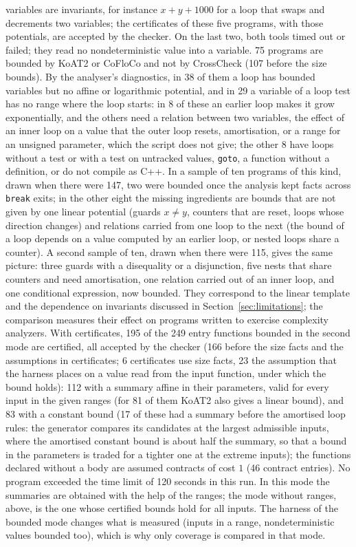 \documentclass[oneside,english]{amsart}
\numberwithin{equation}{section}
\numberwithin{figure}{section}
\theoremstyle{plain}
\theoremstyle{definition}
\theoremstyle{plain}
\theoremstyle{remark}
\theoremstyle{plain}
\theoremstyle{definition}
\theoremstyle{plain}
\theoremstyle{remark}
\begin{document}
variables are invariants, for instance $x + y + 1000$ for a loop that swaps and decrements two variables; the certificates of these five programs, with those potentials, are accepted by the checker. On the last two, both tools timed out or failed; they read no nondeterministic value into a variable. 75 programs are bounded by KoAT2 or CoFloCo and not by CrossCheck (107 before the size bounds). By the analyser's diagnostics, in 38 of them a loop has bounded variables but no affine or logarithmic potential, and in 29 a variable of a loop test has no range where the loop starts: in 8 of these an earlier loop makes it grow exponentially, and the others need a relation between two variables, the effect of an inner loop on a value that the outer loop resets, amortisation, or a range for an unsigned parameter, which the script does not give; the other 8 have loops without a test or with a test on untracked values, \texttt{goto}, a function without a definition, or do not compile as C++. In a sample of ten programs of this kind, drawn when there were 147, two were bounded once the analysis kept facts across \texttt{break} exits; in the other eight the missing ingredients are bounds that are not given by one linear potential (guards $x \ne y$, counters that are reset, loops whose direction changes) and relations carried from one loop to the next (the bound of a loop depends on a value computed by an earlier loop, or nested loops share a counter). A second sample of ten, drawn when there were 115, gives the same picture: three guards with a disequality or a disjunction, five nests that share counters and need amortisation, one relation carried out of an inner loop, and one conditional expression, now bounded. They correspond to the linear template and the dependence on invariants discussed in Section~\ref{sec:limitations}; the comparison measures their effect on programs written to exercise complexity analyzers. With certificates, 195 of the 249 entry functions bounded in the second mode are certified, all accepted by the checker (166 before the size facts and the assumptions in certificates; 6 certificates use size facts, 23 the assumption that the harness places on a value read from the input function, under which the bound holds): 112 with a summary affine in their parameters, valid for every input in the given ranges (for 81 of them KoAT2 also gives a linear bound), and 83 with a constant bound (17 of these had a summary before the amortised loop rules: the generator compares its candidates at the largest admissible inputs, where the amortised constant bound is about half the summary, so that a bound in the parameters is traded for a tighter one at the extreme inputs); the functions declared without a body are assumed contracts of cost $1$ (46 contract entries). No program exceeded the time limit of 120 seconds in this run. In this mode the summaries are obtained with the help of the ranges; the mode without ranges, above, is the one whose certified bounds hold for all inputs. The harness of the bounded mode changes what is measured (inputs in a range, nondeterministic values bounded too), which is why only coverage is compared in that mode.
\end{document}
